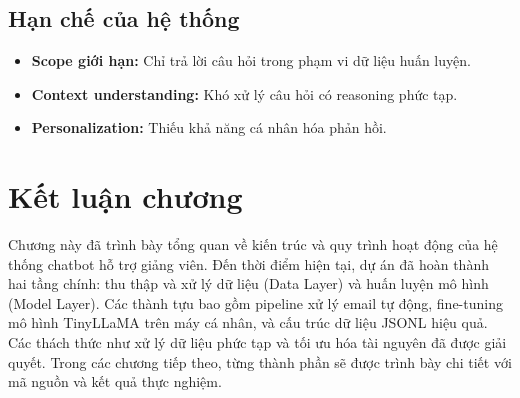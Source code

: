 \documentclass[../DoAn.tex]{subfiles}
\begin{document}
\subsection{Hạn chế của hệ thống}
\begin{itemize}
    \item \textbf{Scope giới hạn:} Chỉ trả lời câu hỏi trong phạm vi dữ liệu huấn luyện.
    \item \textbf{Context understanding:} Khó xử lý câu hỏi có reasoning phức tạp.
    \item \textbf{Personalization:} Thiếu khả năng cá nhân hóa phản hồi.
\end{itemize}

\section{Kết luận chương}
Chương này đã trình bày tổng quan về kiến trúc và quy trình hoạt động của hệ thống chatbot hỗ trợ giảng viên. Đến thời điểm hiện tại, dự án đã hoàn thành hai tầng chính: thu thập và xử lý dữ liệu (Data Layer) và huấn luyện mô hình (Model Layer). Các thành tựu bao gồm pipeline xử lý email tự động, fine-tuning mô hình TinyLLaMA trên máy cá nhân, và cấu trúc dữ liệu JSONL hiệu quả. Các thách thức như xử lý dữ liệu phức tạp và tối ưu hóa tài nguyên đã được giải quyết. Trong các chương tiếp theo, từng thành phần sẽ được trình bày chi tiết với mã nguồn và kết quả thực nghiệm.
\end{document}
